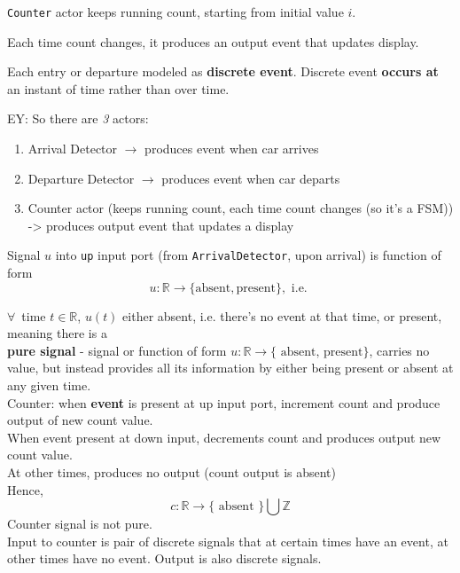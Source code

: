 \documentclass[10pt]{amsart}
\begin{document}
\texttt{Counter} actor keeps running count, starting from initial value $i$. 

Each time count changes, it produces an output event that updates display.

Each entry or departure modeled as \textbf{discrete event}. Discrete event \textbf{occurs at} an instant of time rather than over time.

EY: So there are \emph{3} actors:

\begin{enumerate}
	\item Arrival Detector $\to$ produces event when car arrives
	\item Departure Detector $\to$ produces event when car departs
	\item Counter actor (keeps running count, each time count changes (so it's a FSM)) -> produces output event that updates a display
\end{enumerate}


Signal $u$ into \texttt{up} input port (from \texttt{ArrivalDetector}, upon arrival) is function of form
\[
u : \mathbb{R} \to \lbrace \text{absent}, \text{present} \rbrace, \text{ i.e. }
\]

$\forall \, $ time $t\in \mathbb{R}$, $u(t) $ either absent, i.e. there's no event at that time, or present, meaning there is a \\

\textbf{pure signal} - signal or function of form $u:\mathbb{R} \to \lbrace \text{ absent, present} \rbrace$, carries no value, but instead provides all its information by either being present or absent at any given time. \\

Counter: when \textbf{event} is present at up input port, increment count and produce output of new count value. \\
When event present at down input, decrements count and produces output new count value. \\
At other times, produces no output (count output is absent) \\

Hence, 
\[
c: \mathbb{R} \to \lbrace \text{ absent }\rbrace \bigcup \mathbb{Z}
	\]
	Counter signal is not pure. \\
	
	Input to counter is pair of discrete signals that at certain times have an event, at other times have no event. Output is also discrete signals. \\
	
\end{document}
